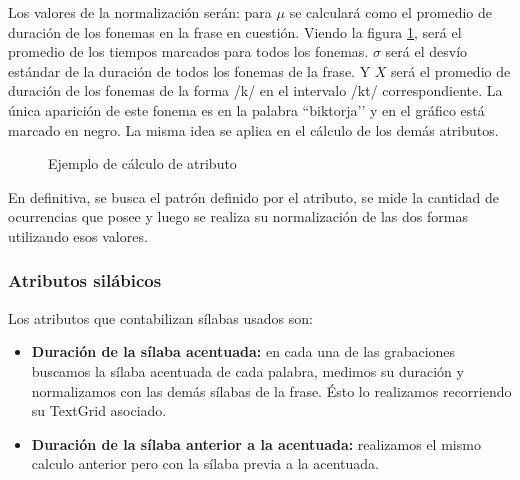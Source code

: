 Los valores de la normalización serán: para $\mu$ se calculará como el promedio de duración de los fonemas en la frase en cuestión. Viendo la figura \ref{ejemploAtribFon},  será el promedio de los tiempos marcados para todos los fonemas. $\sigma$ será el desvío estándar de la duración de todos los fonemas de la frase. Y $X$ será el promedio de duración de los fonemas de la forma /k/ en el intervalo /kt/ correspondiente. La única aparición de este fonema es en la palabra ``biktorja’’ y en el gráfico está marcado en negro. La misma idea se aplica en el cálculo de los demás atributos.

\begin{figure}[H]
\centering
{}
\caption{Ejemplo de cálculo de atributo}
\label{ejemploAtribFon}
\end{figure}

En definitiva, se busca el patrón definido por el atributo, se mide la cantidad de ocurrencias que posee y luego se realiza su normalización de las dos formas utilizando esos valores. 

\subsubsection{Atributos silábicos}

Los atributos que contabilizan sílabas usados son:

\begin{itemize}
    \item \textbf{Duración de la sílaba acentuada:} en cada una de las grabaciones buscamos la sílaba acentuada de cada palabra, medimos su duración y normalizamos con las demás sílabas de la frase. Ésto lo realizamos recorriendo su TextGrid asociado.
    \item \textbf{Duración de la sílaba anterior a la acentuada:} realizamos el mismo calculo anterior pero con la sílaba previa a la acentuada. 
\end{itemize}

